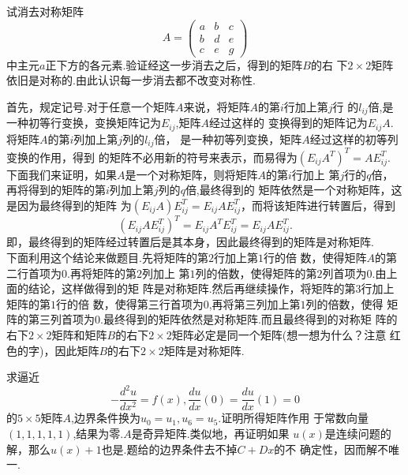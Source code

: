 ﻿\documentclass{book} \usepackage{exsheets} \usepackage{xeCJK}
\begin{document}
\begin{question}
  试消去对称矩阵
$$
A=
\begin{pmatrix}
  a&b&c\\
  b&d&e\\
  c&e&g
\end{pmatrix}
$$
中主元$a$正下方的各元素.验证经这一步消去之后，得到的矩阵$B$的右
下$2\times 2$矩阵依旧是对称的.由此认识每一步消去都不改变对称性.
\end{question}
\begin{solution}
  首先，规定记号.对于任意一个矩阵$A$来说，将矩阵$A$的第$i$行加上第$j$行
  的$l_{ij}$倍,是一种初等行变换，变换矩阵记为$E_{ij}$,矩阵$A$经过这样的
  变换得到的矩阵记为$E_{ij}A$.将矩阵$A$的第$i$列加上第$j$列的$l_{ij}$倍，
  是一种初等列变换，矩阵$A$经过这样的初等列变换的作用，得到
  的矩阵不必用新的符号来表示，而易得为$(E_{ij}A^{T})^T=AE_{ij}^T$.\\

  下面我们来证明，如果$A$是一个对称矩阵，则将矩阵$A$的第$i$行加上
  第$j$行的$q$倍，再将得到的矩阵的第$i$列加上第$j$列的$q$倍,最终得到的
  矩阵依然是一个对称矩阵，这是因为最终得到的矩阵
  为$(E_{ij}A)E_{ij}^T=E_{ij}AE_{ij}^{T}$，而将该矩阵进行转置后，得到
$$
(E_{ij}AE_{ij}^{T})^T=E_{ij}A^TE_{ij}^{T}=E_{ij}AE_{ij}^T.
$$
即，最终得到的矩阵经过转置后是其本身，因此最终得到的矩阵是对称矩阵.\\

下面利用这个结论来做题目.先将矩阵的第$2$行加上第$1$行的倍
数，{\color{red}使得矩阵$A$的第二行首项为$0$}.再将矩阵的第$2$列加上
第$1$列的倍数，使得矩阵的第$2$列首项为$0$.由上面的结论，这样做得到的矩
阵是对称矩阵.然后再继续操作，将矩阵的第$3$行加上矩阵的第$1$行的倍
数，{\color{red}使得第三行首项为$0$},再将第三列加上第$1$列的倍数，使得
矩阵的第三列首项为$0$.最终得到的矩阵依然是对称矩阵.而且最终得到的对称矩
阵的右下$2\times
2$矩阵和矩阵$B$的右下$2\times 2$矩阵必定是同一个矩阵(想一想为什么？注意
红色的字)，因此矩阵$B$的右下$2\times 2$矩阵是对称矩阵.
\end{solution}
\begin{question}
  求逼近
$$
- \frac{d^2u}{dx^2}=f(x),\frac{du}{dx}(0)=\frac{du}{dx}(1)=0
$$
的$5\times 5$矩阵$A$,边界条件换为$u_0=u_1,u_6=u_{5}$.证明所得矩阵作用
于常数向量$(1,1,1,1,1)$,结果为零.$A$是奇异矩阵.类似地，再证明如果
$u(x)$是连续问题的解，那么$u(x)+1$也是.题给的边界条件去不掉$C+Dx$的不
确定性，因而解不唯一.
\end{question}
\end{document}
